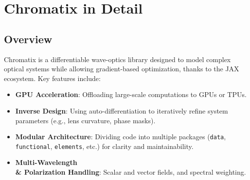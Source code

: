 \documentclass[a4paper,12pt]{report}
\begin{document}
\chapter{Chromatix in Detail}
\section{Overview}
Chromatix is a differentiable wave-optics library designed to model complex optical systems while allowing gradient-based optimization, thanks to the JAX ecosystem. Key features include:
\begin{itemize}
    \item \textbf{GPU Acceleration}: Offloading large-scale computations to GPUs or TPUs.
    \item \textbf{Inverse Design}: Using auto-differentiation to iteratively refine system parameters (e.g., lens curvature, phase masks).
    \item \textbf{Modular Architecture}: Dividing code into multiple packages (\texttt{data}, \texttt{functional}, \texttt{elements}, etc.) for clarity and maintainability.
    \item \textbf{Multi-Wavelength \\& Polarization Handling}: Scalar and vector fields, and spectral weighting.
\end{itemize}
\end{document}

